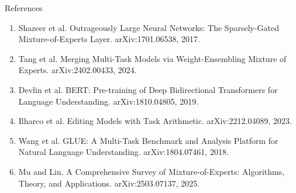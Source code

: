 \documentclass[aspectratio=169,10pt]{beamer}
\begin{document}
\begin{frame}{References}
  \footnotesize
  \begin{enumerate}
    \item[{[1]}] Shazeer et al. Outrageously Large Neural Networks: The Sparsely-Gated Mixture-of-Experts Layer. arXiv:1701.06538, 2017.
    \item[{[2]}] Tang et al. Merging Multi-Task Models via Weight-Ensembling Mixture of Experts. arXiv:2402.00433, 2024.
    \item[{[3]}] Devlin et al. BERT: Pre-training of Deep Bidirectional Transformers for Language Understanding. arXiv:1810.04805, 2019.
    \item[{[4]}] Ilharco et al. Editing Models with Task Arithmetic. arXiv:2212.04089, 2023.
    \item[{[5]}] Wang et al. GLUE: A Multi-Task Benchmark and Analysis Platform for Natural Language Understanding. arXiv:1804.07461, 2018.
    \item[{[6]}] Mu and Lin. A Comprehensive Survey of Mixture-of-Experts: Algorithms, Theory, and Applications. arXiv:2503.07137, 2025.
  \end{enumerate}
\end{frame}
\end{document}
